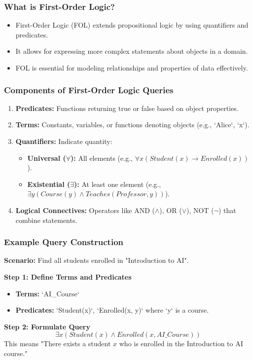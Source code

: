 \documentclass[aspectratio=169]{beamer}
\begin{document}
\begin{frame}[fragile]
    \frametitle{What is First-Order Logic?}
    \begin{itemize}
        \item First-Order Logic (FOL) extends propositional logic by using quantifiers and predicates.
        \item It allows for expressing more complex statements about objects in a domain.
        \item FOL is essential for modeling relationships and properties of data effectively.
    \end{itemize}
\end{frame}

\begin{frame}[fragile]
    \frametitle{Components of First-Order Logic Queries}
    \begin{enumerate}
        \item \textbf{Predicates:} Functions returning true or false based on object properties.
        \item \textbf{Terms:} Constants, variables, or functions denoting objects (e.g., `Alice`, `x`).
        \item \textbf{Quantifiers:} Indicate quantity:
            \begin{itemize}
                \item \textbf{Universal ($\forall$):} All elements (e.g., $\forall x (Student(x) \rightarrow Enrolled(x))$).
                \item \textbf{Existential ($\exists$):} At least one element (e.g., $\exists y (Course(y) \land Teaches(Professor, y))$).
            \end{itemize}
        \item \textbf{Logical Connectives:} Operators like AND ($\land$), OR ($\lor$), NOT ($\neg$) that combine statements.
    \end{enumerate}
\end{frame}

\begin{frame}[fragile]
    \frametitle{Example Query Construction}
    \textbf{Scenario:} Find all students enrolled in "Introduction to AI".

    \textbf{Step 1: Define Terms and Predicates} 
    \begin{itemize}
        \item \textbf{Terms:} `AI\_Course`
        \item \textbf{Predicates:} `Student(x)`, `Enrolled(x, y)` where `y` is a course.
    \end{itemize}
    
    \textbf{Step 2: Formulate Query}
    \begin{equation}
        \exists x (Student(x) \land Enrolled(x, AI\_Course))
    \end{equation}
    This means "There exists a student $x$ who is enrolled in the Introduction to AI course."
\end{frame}
\end{document}

